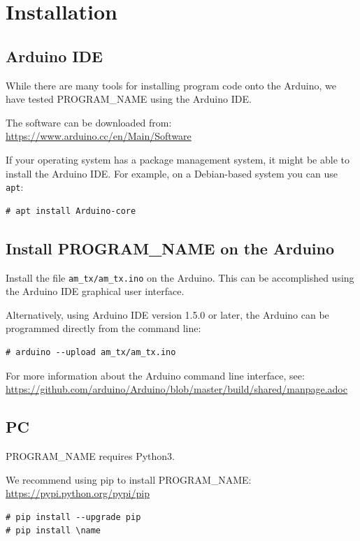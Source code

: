 \documentclass[11pt,letterpaper,article,oneside]{memoir}
\newcommand{\name}{PROGRAM\_NAME}
\begin{document}

\chapter{Installation}

\section{Arduino IDE}
While there are many tools for installing program code onto the Arduino, we have
tested \name{} using the Arduino IDE.

The software can be downloaded from:
\url{https://www.arduino.cc/en/Main/Software}

If your operating system has a package management system, it might be able
to install the Arduino IDE. For example, on a Debian-based system you can use
\texttt{apt}:
\begin{verbatim}
# apt install Arduino-core
\end{verbatim}

\section{Install \name{} on the Arduino}
\label{sec:installarduinocode}

Install the file \verb|am_tx/am_tx.ino| on the Arduino.
This can be accomplished using the Arduino IDE graphical user interface.

Alternatively, using Arduino IDE version 1.5.0 or later,
the Arduino can be programmed directly from the command line:

\begin{verbatim}
# arduino --upload am_tx/am_tx.ino
\end{verbatim}

For more information about the Arduino command line interface, see:
\url{https://github.com/arduino/Arduino/blob/master/build/shared/manpage.adoc}

\section{PC}
\name{} requires Python3.

We recommend using pip to install \name{}:
\url{https://pypi.python.org/pypi/pip}

\begin{verbatim}
# pip install --upgrade pip
# pip install \name
\end{verbatim}
\end{document}
